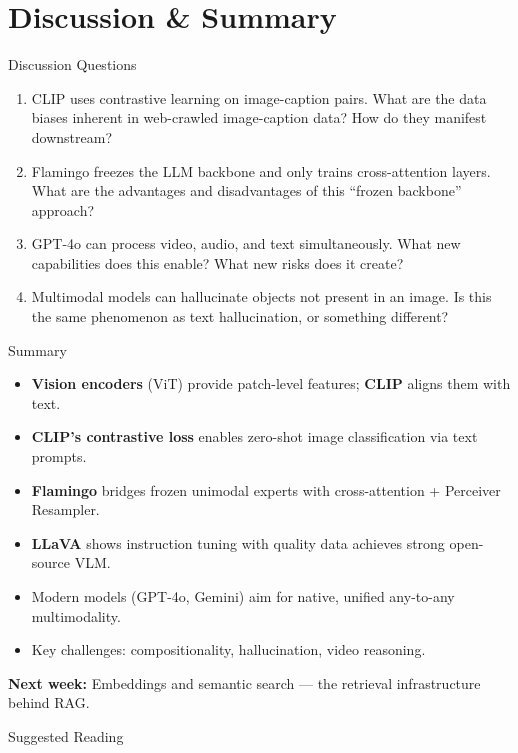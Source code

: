 \documentclass[aspectratio=169,10pt]{beamer}
\begin{document}
\section{Discussion \& Summary}
\begin{frame}{Discussion Questions}
  \begin{enumerate}
    \item CLIP uses contrastive learning on image-caption pairs. What are the data biases inherent in web-crawled image-caption data? How do they manifest downstream?
    \item Flamingo freezes the LLM backbone and only trains cross-attention layers. What are the advantages and disadvantages of this ``frozen backbone'' approach?
    \item GPT-4o can process video, audio, and text simultaneously. What new capabilities does this enable? What new risks does it create?
    \item Multimodal models can hallucinate objects not present in an image. Is this the same phenomenon as text hallucination, or something different?
  \end{enumerate}
\end{frame}

\begin{frame}{Summary}
  \begin{itemize}
    \item \textbf{Vision encoders} (ViT) provide patch-level features; \textbf{CLIP} aligns them with text.
    \item \textbf{CLIP's contrastive loss} enables zero-shot image classification via text prompts.
    \item \textbf{Flamingo} bridges frozen unimodal experts with cross-attention + Perceiver Resampler.
    \item \textbf{LLaVA} shows instruction tuning with quality data achieves strong open-source VLM.
    \item Modern models (GPT-4o, Gemini) aim for native, unified any-to-any multimodality.
    \item Key challenges: compositionality, hallucination, video reasoning.
  \end{itemize}
  \vspace{0.3em}
  \textbf{Next week:} Embeddings and semantic search — the retrieval infrastructure behind RAG.
\end{frame}

\begin{frame}[allowframebreaks]{Suggested Reading}
  \nocite{radford2021learning, alayrac2022flamingo, liu2023llava, openai2023gpt4}
  
\end{frame}
\end{document}
